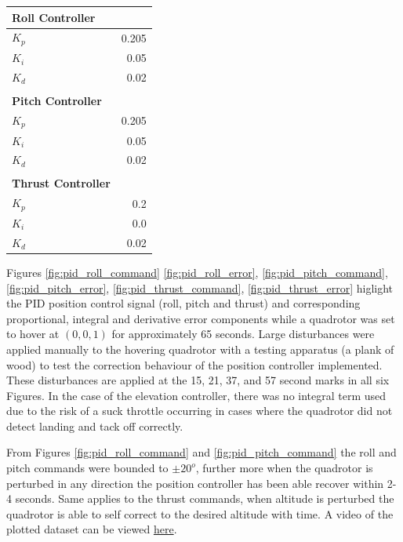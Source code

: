 \documentclass[11pt, twocolumn]{article}
\begin{document}
\begin{center}
	\vspace{-0.4cm}
	\begin{tabular}{l r}
		\hline
		\textbf{Roll Controller} \\
		\hline
		$K_{p}$ &  0.205 \\
		$K_{i}$ & 0.05 \\
		$K_{d}$ &  0.02 \\
		\\
		\hline
		\textbf{Pitch Controller} \\
		\hline
		$K_{p}$ & 0.205 \\
		$K_{i}$ & 0.05 \\
		$K_{d}$ & 0.02 \\
		\\
		\hline
		\textbf{Thrust Controller} \\
		\hline
		$K_{p}$ & 0.2 \\
		$K_{i}$ & 0.0 \\
		$K_{d}$ & 0.02 \\
	\end{tabular}
\end{center}

Figures \ref{fig:pid_roll_command} \ref{fig:pid_roll_error},	\ref{fig:pid_pitch_command}, \ref{fig:pid_pitch_error}, \ref{fig:pid_thrust_command}, \ref{fig:pid_thrust_error} higlight the PID position control signal (roll, pitch and thrust) and corresponding proportional, integral and derivative error components while a quadrotor was set to hover at $(0, 0, 1)$ for approximately 65 seconds. Large disturbances were applied manually to the hovering quadrotor with a testing apparatus (a plank of wood) to test the correction behaviour of the position controller implemented. These disturbances are applied at the 15, 21, 37, and 57 second marks in all six Figures. In the case of the elevation controller, there was no integral term used due to the risk of a suck throttle occurring in cases where the quadrotor did not detect landing and tack off correctly.

From Figures \ref{fig:pid_roll_command} and \ref{fig:pid_pitch_command} the roll and pitch commands were bounded to $\pm 20^o$, further more when the quadrotor is perturbed in any direction the position controller has been able recover within 2-4 seconds. Same applies to the thrust commands, when altitude is perturbed the quadrotor is able to self correct to the desired altitude with time. A video of the plotted dataset can be viewed \href{https://www.youtube.com/watch?v=v1QDdZ0LdMc&index=17&list=PLk5z6lLnKFd6BD9EXWa09hqf6SNQhn59R}{here}.
\end{document}
